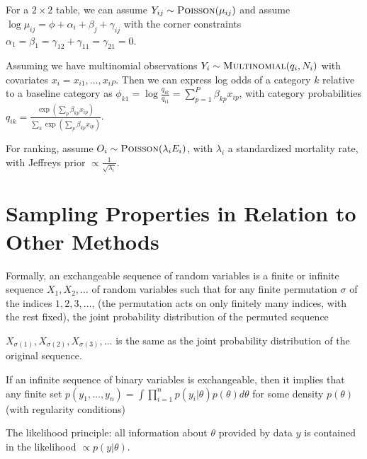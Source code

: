 For a $2 \times 2$ table, we can assume $Y_{ij} \sim
\textsc{Poisson}(\mu_{ij})$ and assume $\log \mu_{ij} = \phi + \alpha_{i} +
\beta_{j} + \gamma_{ij}$ with the corner constraints $\alpha_{1} =
\beta_{1} = \gamma_{12} + \gamma_{11} = \gamma_{21} = 0$.

Assuming we have multinomial observations $Y_{i} \sim
\textsc{Multinomial}(q_{i}, N_{i})$ with covariates $x_{i} = x_{i1}, \dots,
x_{iP}$.  Then we can express log odds of a category $k$ relative to a
baseline category as $\phi_{k1} = \log \frac{q_{ik}}{q_{i1}} =
\sum_{p=1}^{P} \beta_{kp} x_{ip}$, with category probabilities $q_{ik}
= \frac{\exp(\sum_{p} \beta_{kp} x_{ip})}{\sum_{k}^{} \exp(\sum_{p}^{}
  \beta_{kp} x_{ip})}$.

\begin{defn}
  \label{sec:categ-data-pred-2}
  For ranking, assume $O_{i} \sim \textsc{Poisson}(\lambda_{i} E_{i})$, with
  $\lambda_{i}$ a standardized mortality rate, with Jeffreys prior
  $\propto \frac{1}{\sqrt{\lambda_{i}}}$.
\end{defn}

\section{Sampling Properties in Relation to Other Methods}
\label{sec:sampl-prop-relat}

\begin{defn}
  Formally, an exchangeable sequence of random variables is a finite
  or infinite sequence $X_{1}, X_{2}, \dots$ of random variables such
  that for any finite permutation $\sigma$ of the indices $1, 2, 3,
  \dots$, (the permutation acts on only finitely many indices, with
  the rest fixed), the joint probability distribution of the permuted
  sequence

  $X_{\sigma(1)}, X_{\sigma(2)}, X_{\sigma(3)}, \dots$ is the same as
  the joint probability distribution of the original
  sequence.
\end{defn}

\begin{thm}
  \label{sec:sampl-prop-relat-2}
  If an infinite sequence of binary variables is exchangeable, then it
  implies that any finite set $p(y_{1}, \dots, y_{n}) = \int
  \prod_{i=1}^{n} p(y_{i} | \theta) p(\theta) d \theta$ for some
  density $p(\theta)$ (with regularity conditions)
\end{thm}

\begin{defn}
  \label{sec:sampl-prop-relat-3}
  The likelihood principle: all information about $\theta$ provided by
  data $y$ is contained in the likelihood $\propto p(y | \theta)$.
\end{defn}


